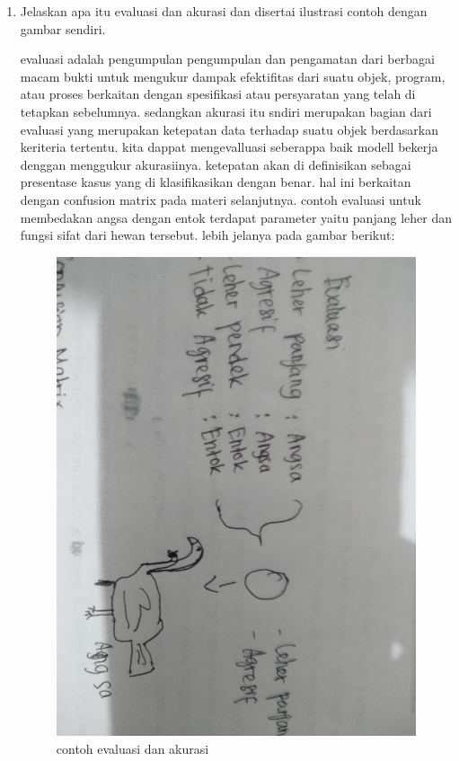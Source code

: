 \begin{enumerate}
\item Jelaskan apa itu evaluasi dan akurasi dan disertai ilustrasi contoh dengan gambar sendiri.\par
evaluasi adalah pengumpulan pengumpulan dan pengamatan dari berbagai macam bukti untuk mengukur dampak efektifitas dari suatu objek, program, atau proses berkaitan  dengan spesifikasi atau persyaratan yang telah di tetapkan sebelumnya. sedangkan akurasi itu sndiri merupakan bagian dari evaluasi yang merupakan ketepatan data terhadap suatu objek berdasarkan keriteria tertentu. kita dappat mengevalluasi seberappa baik modell bekerja denggan menggukur akurasiinya. ketepatan akan di definisikan sebagai presentase kasus yang di klasifikasikan dengan benar. hal ini berkaitan dengan confusion matrix pada materi selanjutnya. contoh evaluasi untuk membedakan angsa dengan entok terdapat parameter yaitu panjang leher dan fungsi sifat dari hewan tersebut. lebih jelanya pada gambar berikut:
\begin{figure}[ht]
\centering
\includegraphics[scale=0.01]{figures/1174050/chapter2/5.jpg}
\caption{contoh evaluasi dan akurasi}
\label{contoh}
\end{figure}



\end{enumerate}

